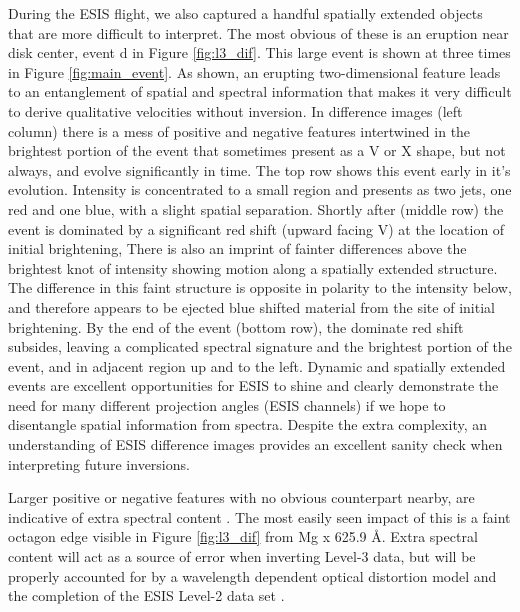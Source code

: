     	During the ESIS flight, we also captured a handful spatially extended objects that are more difficult to interpret.
    	The most obvious of these is an eruption near disk center, event d in Figure \ref{fig:l3_dif}.
    	This large event is shown at three times in Figure \ref{fig:main_event}.
    	As shown, an erupting two-dimensional feature leads to an entanglement of spatial and spectral information that makes it very difficult to derive qualitative velocities without inversion.
    	In difference images (left column) there is a mess of positive and negative features intertwined in the brightest portion of the event that sometimes present as a V or X shape, but not always, and evolve significantly in time.
    	The top row shows this event early in it's evolution. 
    	Intensity is concentrated to a small region and presents as two jets, one red and one blue, with a slight spatial separation.
    	Shortly after (middle row) the event is dominated by a significant red shift (upward facing V) at the location of initial brightening, 
    	There is also an imprint of fainter differences above the brightest knot of intensity showing motion along a spatially extended structure.
    	The difference in this faint structure is opposite in polarity to the intensity below, and therefore appears to be ejected blue shifted material from the site of initial brightening.
    	By the end of the event (bottom row), the dominate red shift subsides, leaving a complicated spectral signature and the brightest portion of the event, and in adjacent region up and to the left.  
    	Dynamic and spatially extended events are excellent opportunities for ESIS to shine and clearly demonstrate the need for many different projection angles (ESIS channels) if we hope to disentangle spatial information from spectra.
    	Despite the extra complexity, an understanding of ESIS difference images provides an excellent sanity check when interpreting future inversions.
    	
    
    	Larger positive or negative features with no obvious counterpart nearby, are indicative of extra spectral content \citep{RustPhD,Parker2021}.
    	The most easily seen impact of this is a faint octagon edge visible in Figure \ref{fig:l3_dif} from Mg {\sc x} 625.9 \AA.
    	Extra spectral content will act as a source of error when inverting Level-3 data, but will be properly accounted for by a wavelength dependent optical distortion model and the completion of the ESIS Level-2 data set \citep{Smart2022}. 	 
    
